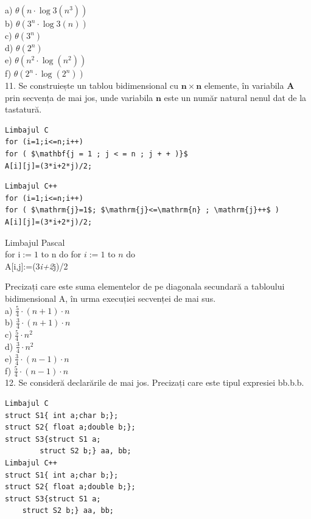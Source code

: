 \documentclass[10pt]{article}
\begin{document}
a) $\theta\left(n \cdot \log 3\left(n^{3}\right)\right)$\\
b) $\theta\left(3^{n} \cdot \log 3(n)\right)$\\
c) $\theta\left(3^{n}\right)$\\
d) $\theta\left(2^{n}\right)$\\
e) $\theta\left(n^{2} \cdot \log \left(n^{2}\right)\right)$\\
f) $\theta\left(2^{n} \cdot \log \left(2^{n}\right)\right)$\\
11. Se construiește un tablou bidimensional cu $\mathbf{n} \times \mathbf{n}$ elemente, în variabila $\mathbf{A}$ prin secvența de mai jos, unde variabila $\mathbf{n}$ este un număr natural nenul dat de la tastatură.

\begin{verbatim}
Limbajul C
for (i=1;i<=n;i++)
for ( $\mathbf{j = 1 ; j < = n ; j + + )}$
A[i][j]=(3*i+2*j)/2;
\end{verbatim}

\begin{verbatim}
Limbajul C++
for (i=1;i<=n;i++)
for ( $\mathrm{j}=1$; $\mathrm{j}<=\mathrm{n} ; \mathrm{j}++$ )
A[i][j]=(3*i+2*j)/2;
\end{verbatim}

Limbajul Pascal\\
for $\mathrm{i}:=1$ to n do for $i:=1$ to $n$ do\\[0pt]
A[i,j]:=(3\textit{i+2}j)/2

Precizați care este suma elementelor de pe diagonala secundară a tabloului bidimensional A, în urma execuției secvenței de mai sus.\\
a) $\frac{5}{4} \cdot(n+1) \cdot n$\\
b) $\frac{3}{4} \cdot(n+1) \cdot n$\\
c) $\frac{5}{4} \cdot n^{2}$\\
d) $\frac{3}{4} \cdot n^{2}$\\
e) $\frac{3}{4} \cdot(n-1) \cdot n$\\
f) $\frac{5}{4} \cdot(n-1) \cdot n$\\
12. Se consideră declarările de mai jos. Precizați care este tipul expresiei bb.b.b.

\begin{verbatim}
Limbajul C
struct S1{ int a;char b;};
struct S2{ float a;double b;};
struct S3{struct S1 a;
        struct S2 b;} aa, bb;
Limbajul C++
struct S1{ int a;char b;};
struct S2{ float a;double b;};
struct S3{struct S1 a;
    struct S2 b;} aa, bb;
\end{verbatim}
\end{document}
